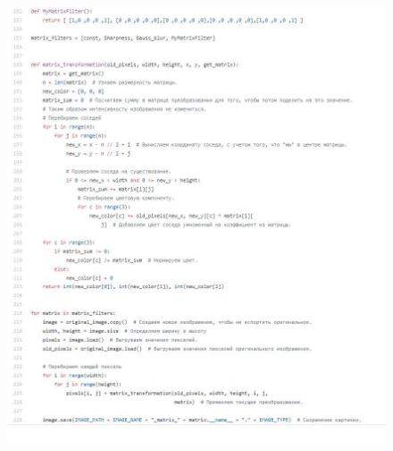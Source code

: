 \documentclass[a4paper,12pt]{article}
\begin{document}
\newpage
\begin{figure}
\begin{center}
\begin{minipage}[h]{1\linewidth}
\includegraphics[width=1\linewidth]{code_4}
\end{minipage}
\end{center}

\end{figure}
\end{document}
